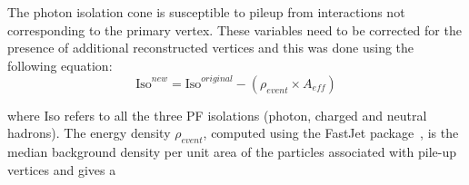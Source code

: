 The photon isolation cone is susceptible to pileup from interactions not corresponding to the primary vertex. These variables need to be corrected
for the presence of additional reconstructed vertices and this was done using the following equation:
\begin{equation}
\text{Iso}^{new} = \text{Iso}^{original} - (\rho_{event}\times A_{eff})
\end{equation}

where Iso refers to all the three PF isolations (photon, charged and neutral hadrons). The energy density $\rho_{event}$, computed using the 
FastJet package~\cite{Cacciari2011ma}, is the median background density per unit area of the particles associated with pile-up vertices and gives a
